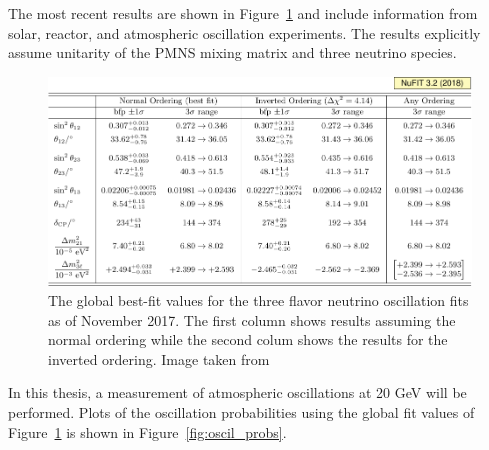 The most recent results are shown in Figure~\ref{fig:nufit_v32} and include information from solar, reactor, and atmospheric oscillation experiments.
The results explicitly assume unitarity of the PMNS mixing matrix and three neutrino species.

\begin{figure}[!h]
\includegraphics[width=\linewidth]{nufit_v32.pdf}
\caption[Global best fit neutrino oscillation parameters from Nu-Fit.org]{The global best-fit values for the three flavor neutrino oscillation fits as of November 2017. The first column shows results assuming the normal ordering while the second colum shows the results for the inverted ordering. Image taken from \cite{NuFit.org}}
\label{fig:nufit_v32}
\end{figure}

In this thesis, a measurement of atmospheric oscillations at 20 GeV will be performed. 
Plots of the oscillation probabilities using the global fit values of Figure~\ref{fig:nufit_v32} is shown in Figure~\ref{fig:oscil_probs}.




